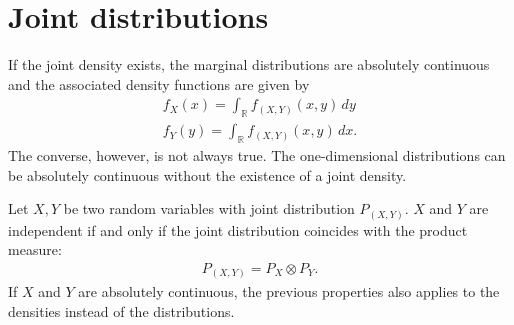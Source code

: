 \section{Joint distributions}


    \begin{result}
        If the joint density exists, the marginal distributions are absolutely continuous and the associated density functions are given by
        \begin{gather}
            f_X(x) = \int_\mathbb{R}f_{(X,Y)}(x,y)\,dy\\
            f_Y(y) = \int_\mathbb{R}f_{(X,Y)}(x,y)\,dx.
        \end{gather}
        The converse, however, is not always true. The one-dimensional distributions can be absolutely continuous without the existence of a joint density.
    \end{result}

    \begin{property}[Independence]\label{prob:independent_densities}
        Let $X,Y$ be two random variables with joint distribution $P_{(X,Y)}$. $X$ and $Y$ are independent if and only if the joint distribution coincides with the product measure:
        \begin{gather}
            P_{(X,Y)} = P_X\otimes P_Y.
        \end{gather}
        If $X$ and $Y$ are absolutely continuous, the previous properties also applies to the densities instead of the distributions.
    \end{property}

